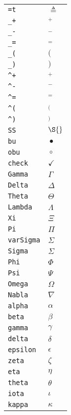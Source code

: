 \begin{longtable}{ll}
\texttt{=t}&${}\triangleq {}$\\
\texttt{\_+}&${}_+ {}$\\
\texttt{\_{-}}&${}_- {}$\\
\texttt{\_=}&${}_= {}$\\
\texttt{\_(}&${}( {}$\\
\texttt{\_)}&${}) {}$\\
\texttt{\textasciicircum +}&${}^+ {}$\\
\texttt{\textasciicircum {-}}&${}^- {}$\\
\texttt{\textasciicircum =}&${}^= {}$\\
\texttt{\textasciicircum (}&${}^( {}$\\
\texttt{\textasciicircum )}&${}^) {}$\\
\texttt{SS}&${}\S {}$\\
\texttt{bu}&${}\bullet {}$\\
\texttt{obu}&${}\circ {}$\\
\texttt{check}&${}\checkmark {}$\\
\texttt{Gamma}&${}\Gamma {}$\\
\texttt{Delta}&${}\Delta {}$\\
\texttt{Theta}&${}\Theta {}$\\
\texttt{Lambda}&${}\Lambda {}$\\
\texttt{Xi}&${}\Xi {}$\\
\texttt{Pi}&${}\Pi {}$\\
\texttt{varSigma}&${}\varSigma {}$\\
\texttt{Sigma}&${}\Sigma {}$\\
\texttt{Phi}&${}\Phi {}$\\
\texttt{Psi}&${}\Psi {}$\\
\texttt{Omega}&${}\Omega {}$\\
\texttt{Nabla}&${}\nabla {}$\\
\texttt{alpha}&${}\alpha {}$\\
\texttt{beta}&${}\beta {}$\\
\texttt{gamma}&${}\gamma {}$\\
\texttt{delta}&${}\delta {}$\\
\texttt{epsilon}&${}\epsilon {}$\\
\texttt{zeta}&${}\zeta {}$\\
\texttt{eta}&${}\eta {}$\\
\texttt{theta}&${}\theta {}$\\
\texttt{iota}&${}\iota {}$\\
\texttt{kappa}&${}\kappa {}$\\

\end{longtable}
